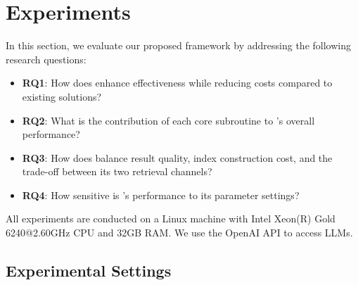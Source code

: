 

\section{Experiments}\label{ref:exp}
In this section, we evaluate our proposed \sketrag framework by addressing the following research questions:
\begin{itemize}[topsep=2pt,itemsep=1pt,parsep=0pt,partopsep=0pt,leftmargin=11pt]
\item \textbf{RQ1}: How does \sketrag enhance effectiveness while reducing costs compared to existing solutions?
\item \textbf{RQ2}: What is the contribution of each core subroutine to \sketrag's overall performance?
\item \textbf{RQ3}: How does \sketrag balance result quality, index construction cost, and the trade-off between its two retrieval channels?
\item \textbf{RQ4}: How sensitive is \sketrag's performance to its parameter settings?
\end{itemize}
All experiments are conducted on a Linux machine with Intel Xeon(R) Gold 6240@2.60GHz CPU and 32GB RAM. We use the OpenAI API to access LLMs.





\subsection{Experimental Settings}\label{sec:exp-set}

